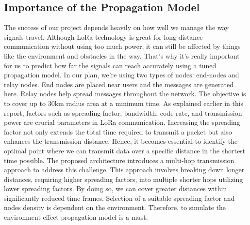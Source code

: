 \subsection{Importance of the Propagation Model}
\label{sec:Propagation Model}
The success of our project depends heavily on how well we manage the way signals travel. Although LoRa technology is great for long-distance communication without using too much power, it can still be affected by things like the environment and obstacles in the way. That's why it's really important for us to predict how far the signals can reach accurately using a tuned propagation model. In our plan, we're using two types of nodes: end-nodes and relay nodes. End nodes are placed near users and the messages are generated here. Relay nodes help spread messages throughout the network. The objective is to cover up to 30km radius area at a minimum time.
As explained earlier in this report, factors such as spreading factor, bandwidth, code-rate, and transmission power are crucial parameters in LoRa communication. Increasing the spreading factor not only extends the total time required to transmit a packet but also enhances the transmission distance. Hence, it becomes essential to identify the optimal point where we can transmit data over a specific distance in the shortest time possible. The proposed architecture introduces a multi-hop transmission approach to address this challenge. This approach involves breaking down longer distances, requiring higher spreading factors, into multiple shorter hops utilizing lower spreading factors. By doing so, we can cover greater distances within significantly reduced time frames. Selection of a suitable spreading factor and nodes density is dependent on the environment. Therefore, to simulate the environment effect propagation model is a must.

